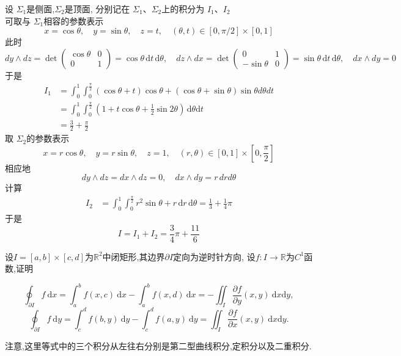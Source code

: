 \documentclass[lang=cn,12pt,color=green,fontset=none,thmcnt=section]{elegantbook}
\begin{document}
\begin{solution}
   设 $ \Sigma _{1} $是侧面,$ \Sigma_{2} $是顶面, 分别记在 $ \Sigma_1 $、$ \Sigma_2 $上的积分为 $ I_1  $、$ I_2    $ \\      可取与 $\Sigma_1  $相容的参数表示 $$
 x =  \cos \theta    ,\quad y =  \sin \theta     ,\quad  z = t ,\quad  \left(  \theta, t  \right) \in \left[  0 , \pi /2  \right]      \times  \left[  0 ,1  \right]      
    $$此时 $$
    dy \wedge  d z  = \det \begin{pmatrix} 
         \cos \theta  & 0 \\
         0& 1 
    \end{pmatrix} = \cos \theta \,\mathrm{d}t \,\mathrm{d} \theta,\quad dz \wedge  dx = \det \begin{pmatrix} 
         0 & 1 \\ -\sin  \theta  & 0   
    \end{pmatrix} =  \sin \theta  \,\mathrm{d}t\,\mathrm{d} \theta,\quad d  x \wedge dy =0
    $$于是 $$
    \begin{aligned}
     I_1 & =  \int _{0}^{1} \int _{0}^{\frac{\pi}{2}} \left( \cos \theta +  t \right) \cos \theta +  \left(  \cos \theta +  \sin \theta \right)\sin \theta   d \theta dt  \\ 
     & = \int_{0}^{1}\int_{0}^{ \frac{\pi}{2}} \left( 1+  t\cos \theta +  \frac{1}{2}\sin  2\theta \right)  \,\mathrm{d}\theta \mathrm{d}t \\ 
     & =  \frac{3}{2}+  \frac{\pi}{2}
    \end{aligned}
    $$
    取 $ \Sigma_{2} $的参数表示 $$
    x= r\cos \theta ,\quad y= r \sin  \theta,\quad z = 1,\quad \left( r,\theta \right) \in  [ 0,1]\times  [0, \frac{\pi}{2}] 
 $$ 相应地 $$
 dy \wedge dz= dx \wedge  dz = 0,\quad dx \wedge  dy=r\,dr d\theta 
 $$计算 $$
    \begin{aligned}
     I_{2}& = \int_{0}^{1} \int_{0}^{\frac{\pi}{2}} r^{2}\sin \theta+ r \,\mathrm{d}r \,\mathrm{d}\theta= \frac{1}{3} +  \frac{1}{4}\pi 
    \end{aligned}
    $$
于是 $$
I = I_1+ I_2=\frac{3}{4}\pi+  \frac{11}{6}
$$

\end{solution}

\begin{exercise}
    设$I=[a,b]\times[c,d]$为$\mathbb{R}^2$中闭矩形,其边界$\partial I$定向为逆时针方向,
    设$f:I\to\mathbb{R}$为$C^1$函数,证明

$$\oint_{\partial I}f\:\mathrm{d}x=\int_{a}^{b}f(x,c)\:\mathrm{d}x-\int_{a}^{b}f(x,d)\:\mathrm{d}x=-\iint_{I}\frac{\partial f}{\partial y}(x,y)\:\mathrm{d}x\mathrm{d}y,$$ $$\oint_{\partial I}f\:\mathrm{d}y=\int_{c}^{d}f(b,y)\:\mathrm{d}y-\int_{c}^{d}f(a,y)\:\mathrm{d}y=\iint_{I}\frac{\partial f}{\partial x}(x,y)\:\mathrm{d}x\mathrm{d}y.$$



注意,这里等式中的三个积分从左往右分别是第二型曲线积分,定积分以及二重积分.
\end{exercise}
\end{document}
